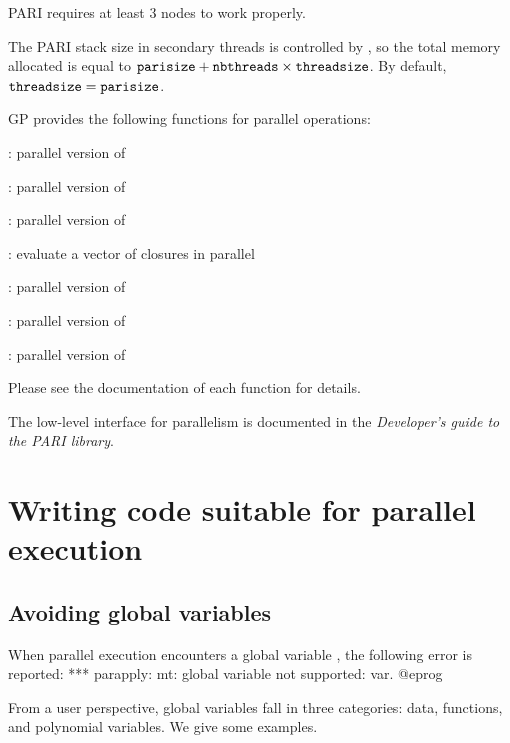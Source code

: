 PARI requires at least $3$ nodes to work properly.


The PARI stack size in secondary threads is controlled by
, so the total memory allocated is equal to
${\tt parisize}+{\tt nbthreads}\times{\tt threadsize}$.  By default,
${\tt threadsize}={\tt parisize}$.


GP provides the following functions for parallel operations:

\item {}: parallel version of 

\item {}:  parallel version of 

\item {}:    parallel version of 

\item {}:   evaluate a vector of closures in parallel

\item {}:    parallel version of 

\item {}:   parallel version of 

\item {}: parallel version of 

Please see the documentation of each function for details.

The low-level  interface for parallelism is documented
in the \emph{Developer's guide to the PARI library}.

\chapter{Writing code suitable for parallel execution}

\section{Avoiding global variables}

When parallel execution encounters a global variable ,
the following error is reported:
\bprog
  *** parapply: mt: global variable not supported: var.
@eprog

From a user perspective, global variables fall in three categories:
data, functions, and polynomial variables. We give some examples.

